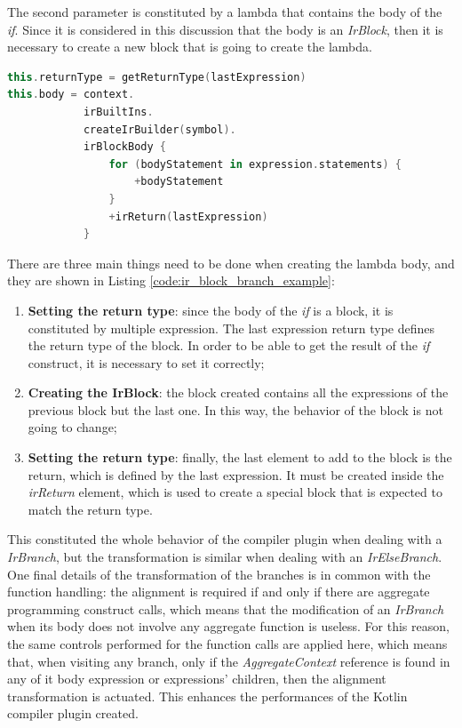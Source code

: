The second parameter is constituted by a lambda that contains the body of the \textit{if}. Since it is considered in this discussion that the body is an \textit{IrBlock}, then it is necessary to create a new block that is going to create the lambda.
\begin{lstlisting}[caption={Creation of the lambda body when modifying a \textit{IrBranch}}, captionpos=b, language=Kotlin, label={code:ir_block_branch_example}]
this.returnType = getReturnType(lastExpression)
this.body = context.
            irBuiltIns.
            createIrBuilder(symbol).
            irBlockBody {
                for (bodyStatement in expression.statements) { 
                    +bodyStatement 
                }
                +irReturn(lastExpression)
            }
\end{lstlisting}
There are three main things need to be done when creating the lambda body, and they are shown in Listing \ref{code:ir_block_branch_example}:
\begin{enumerate}
    \item \textbf{Setting the return type}: since the body of the \textit{if} is a block, it is constituted by multiple expression. The last expression return type defines the return type of the block. In order to be able to get the result of the \textit{if} construct, it is necessary to set it correctly;
    \item \textbf{Creating the IrBlock}: the block created contains all the expressions of the previous block but the last one. In this way, the behavior of the block is not going to change;
    \item \textbf{Setting the return type}: finally, the last element to add to the block is the return, which is defined by the last expression. It must be created inside the \textit{irReturn} element, which is used to create a special block that is expected to match the return type.
\end{enumerate}

This constituted the whole behavior of the compiler plugin when dealing with a \textit{IrBranch}, but the transformation is similar when dealing with an \textit{IrElseBranch}.\newline
One final details of the transformation of the branches is in common with the function handling: the alignment is required if and only if there are aggregate programming construct calls, which means that the modification of an \textit{IrBranch} when its body does not involve any aggregate function is useless.\newline
For this reason, the same controls performed for the function calls are applied here, which means that, when visiting any branch, only if the \textit{AggregateContext} reference is found in any of it body expression or expressions' children, then the alignment transformation is actuated. This enhances the performances of the Kotlin compiler plugin created.

